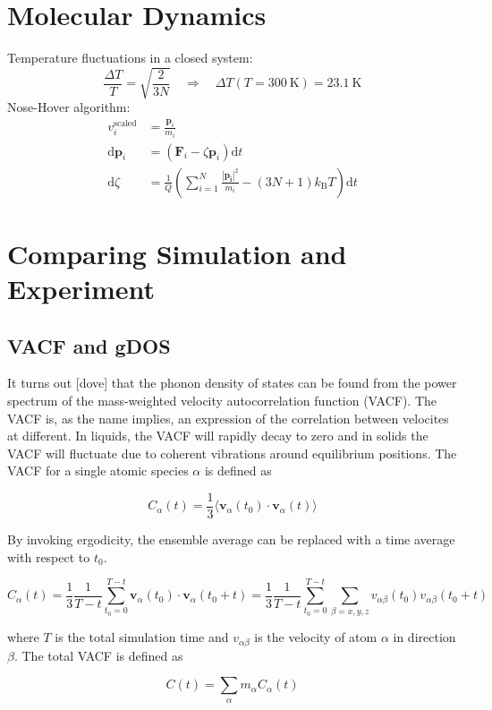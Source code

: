 \section{Molecular Dynamics}\label{sec:method_md}
Temperature fluctuations in a closed system:
%
\[ \frac{\Delta T}{T} = \sqrt{\frac{2}{3N}} \quad \Rightarrow \quad \Delta T(T=\SI{300}{\kelvin}) = \SI{23.1}{\kelvin} \]
%
Nose-Hover algorithm:
%
\begin{align*}
v_i^\text{scaled} &= \frac{\bm{p}_i}{m_i} \\
\text{d}\bm{p}_i &= (\bm{F}_i - \zeta \bm{p}_i) \text{d}t \\
\text{d}\zeta &= \frac{1}{Q} \left( \sum_{i=1}^N \frac{|\bm{p_i}|^2}{m_i} - (3N+1)k_\text{B}T\right) \text{d}t
\end{align*}

\section{Comparing Simulation and Experiment}\label{sec:sim_experiment_compare}

\subsection{VACF and gDOS}
It turns out [dove] that the phonon density of states can be found from the power spectrum of the mass-weighted velocity autocorrelation function (VACF). The VACF is, as the name implies, an expression of the correlation between velocites at different. In liquids, the VACF will rapidly decay to zero and in solids the VACF will fluctuate due to coherent vibrations around equilibrium positions. The VACF for a single atomic species $\alpha$ is defined as

\[ C_\alpha(t) = \frac{1}{3} \langle \bm{v}_\alpha(t_0) \cdot \bm{v}_\alpha(t) \rangle \]

\noindent By invoking ergodicity, the ensemble average can be replaced with a time average with respect to $t_0$.

\[ C_\alpha(t) = \frac{1}{3} \frac{1}{T-t} \sum_{t_0=0}^{T-t} \bm{v}_\alpha(t_0) \cdot \bm{v}_\alpha(t_0 + t) = \frac{1}{3} \frac{1}{T-t} \sum_{t_0=0}^{T-t} \sum_{\beta=x,y,z} v_{\alpha\beta}(t_0) v_{\alpha\beta}(t_0 + t) \]

\noindent where $T$ is the total simulation time and $v_{\alpha\beta}$ is the velocity of atom $\alpha$ in direction $\beta$. The total VACF is defined as

\[ C(t) = \sum_\alpha m_\alpha C_\alpha(t) \]

